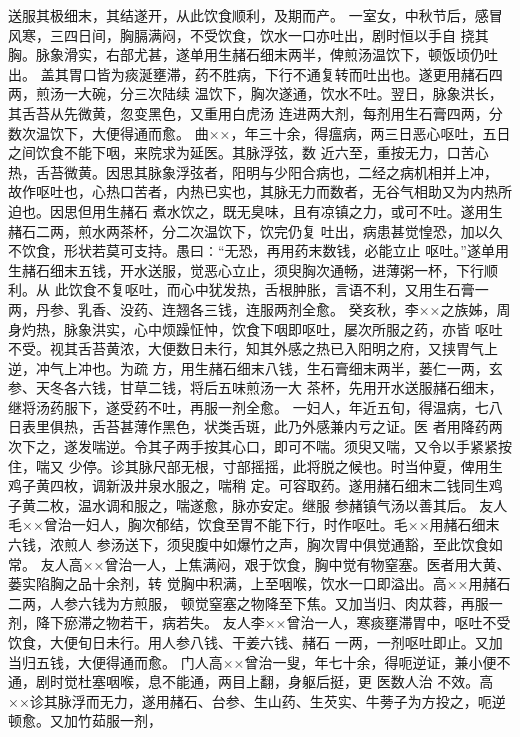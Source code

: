 \documentclass[a4paper,12pt,UTF8,twoside]{ctexbook}
\begin{document}
送服其极细末，其结遂开，从此饮食顺利，及期而产。 
一室女，中秋节后，感冒风寒，三四日间，胸膈满闷，不受饮食，饮水一口亦吐出，剧时恒以手自 
挠其胸。脉象滑实，右部尤甚，遂单用生赭石细末两半，俾煎汤温饮下，顿饭顷仍吐出。 
盖其胃口皆为痰涎壅滞，药不胜病，下行不通复转而吐出也。遂更用赭石四两，煎汤一大碗，分三次陆续 
温饮下，胸次遂通，饮水不吐。翌日，脉象洪长，其舌苔从先微黄，忽变黑色，又重用白虎汤 
连进两大剂，每剂用生石膏四两，分数次温饮下，大便得通而愈。 
曲××，年三十余，得瘟病，两三日恶心呕吐，五日之间饮食不能下咽，来院求为延医。其脉浮弦，数 
近六至，重按无力，口苦心热，舌苔微黄。因思其脉象浮弦者，阳明与少阳合病也，二经之病机相并上冲， 
故作呕吐也，心热口苦者，内热已实也，其脉无力而数者，无谷气相助又为内热所迫也。因思但用生赭石 
煮水饮之，既无臭味，且有凉镇之力，或可不吐。遂用生赭石二两，煎水两茶杯，分二次温饮下，饮完仍复 
吐出，病患甚觉惶恐，加以久不饮食，形状若莫可支持。愚曰∶“无恐，再用药末数钱，必能立止 
呕吐。”遂单用生赭石细末五钱，开水送服，觉恶心立止，须臾胸次通畅，进薄粥一杯，下行顺利。从 
此饮食不复呕吐，而心中犹发热，舌根肿胀，言语不利，又用生石膏一 
两，丹参、乳香、没药、连翘各三钱，连服两剂全愈。 
癸亥秋，李××之族姊，周身灼热，脉象洪实，心中烦躁怔忡，饮食下咽即呕吐，屡次所服之药，亦皆 
呕吐不受。视其舌苔黄浓，大便数日未行，知其外感之热已入阳明之府，又挟胃气上逆，冲气上冲也。为疏 
方，用生赭石细末八钱，生石膏细末两半，蒌仁一两，玄参、天冬各六钱，甘草二钱，将后五味煎汤一大 
茶杯，先用开水送服赭石细末，继将汤药服下，遂受药不吐，再服一剂全愈。 
一妇人，年近五旬，得温病，七八日表里俱热，舌苔甚薄作黑色，状类舌斑，此乃外感兼内亏之证。医 
者用降药两次下之，遂发喘逆。令其子两手按其心口，即可不喘。须臾又喘，又令以手紧紧按住，喘又 
少停。诊其脉尺部无根，寸部摇摇，此将脱之候也。时当仲夏，俾用生鸡子黄四枚，调新汲井泉水服之，喘稍 
定。可容取药。遂用赭石细末二钱同生鸡子黄二枚，温水调和服之，喘遂愈，脉亦安定。继服 
参赭镇气汤以善其后。 
友人毛××曾治一妇人，胸次郁结，饮食至胃不能下行，时作呕吐。毛××用赭石细末六钱，浓煎人 
参汤送下，须臾腹中如爆竹之声，胸次胃中俱觉通豁，至此饮食如常。 
友人高××曾治一人，上焦满闷，艰于饮食，胸中觉有物窒塞。医者用大黄、蒌实陷胸之品十余剂，转 
觉胸中积满，上至咽喉，饮水一口即溢出。高××用赭石二两，人参六钱为方煎服， 
顿觉窒塞之物降至下焦。又加当归、肉苁蓉，再服一剂，降下瘀滞之物若干，病若失。 
友人李××曾治一人，寒痰壅滞胃中，呕吐不受饮食，大便旬日未行。用人参八钱、干姜六钱、赭石 
一两，一剂呕吐即止。又加当归五钱，大便得通而愈。 
门人高××曾治一叟，年七十余，得呃逆证，兼小便不通，剧时觉杜塞咽喉，息不能通，两目上翻，身躯后挺，更 
医数人治 
不效。高××诊其脉浮而无力，遂用赭石、台参、生山药、生芡实、牛蒡子为方投之，呃逆顿愈。又加竹茹服一剂， 
\end{document}
